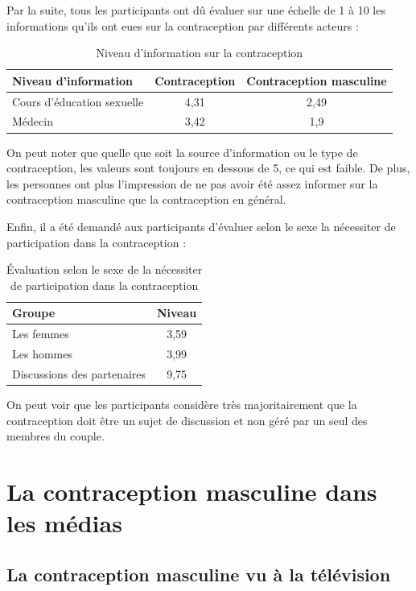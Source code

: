 \documentclass[12pt,a4paper]{report}
\begin{document}
Par la suite, tous les participants ont dû évaluer sur une échelle de 1 à 10 les informations qu'ils ont eues sur la contraception par différents acteurs :

\begin{table}[ht]
\centering
\begin{tabular}{|l|c|c|}
\hline
Niveau d'information & \textbf{Contraception} & \textbf{Contraception masculine} \\
\hline
Cours d'éducation sexuelle & 4,31 & 2,49 \\
Médecin & 3,42 & 1,9 \\
\hline
\end{tabular}
\caption{Niveau d'information sur la contraception}
\end{table}

On peut noter que quelle que soit la source d'information ou le type de contraception, les valeurs sont toujours en dessous de 5, ce qui est faible. De plus, les personnes ont plus l'impression de ne pas avoir été assez informer sur la contraception masculine que la contraception en général.

Enfin, il a été demandé aux participants d'évaluer selon le sexe la nécessiter de participation dans la contraception :

\begin{table}[ht]
\centering
\begin{tabular}{|l|c|}
\hline
\textbf{Groupe} & \textbf{Niveau} \\
\hline
Les femmes & 3,59 \\
Les hommes & 3,99 \\
Discussions des partenaires & 9,75 \\
\hline
\end{tabular}
\caption{Évaluation selon le sexe de la nécessiter de participation dans la contraception}
\end{table}

On peut voir que les participants considère très majoritairement que la contraception doit être un sujet de discussion et non géré par un seul des membres du couple.

\section{La contraception masculine dans les médias}

\subsection{La contraception masculine vu à la télévision}
\end{document}
